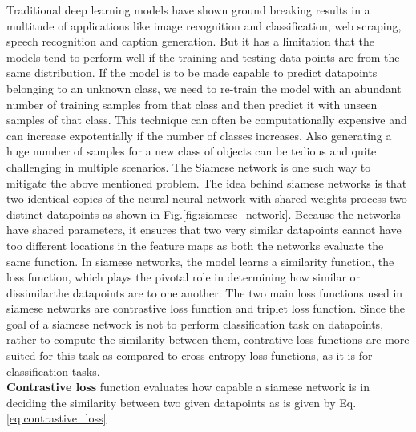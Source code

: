 Traditional deep learning models have shown ground breaking results in a multitude of applications like image recognition and classification, web scraping, speech recognition and caption generation. But it has a limitation that the models tend to perform well if the training and testing data points are from the same distribution. If the model is to be made capable to predict datapoints belonging to an unknown class, we need to re-train the model with an abundant number of training samples from that class and then predict it with unseen samples of that class. This technique can often be computationally expensive and can increase expotentially if the number of classes increases. Also generating a huge number of samples for a new class of objects can be tedious and quite challenging in multiple scenarios. The Siamese network\cite*{koch2015siamese,bromley1993signature} is one such way to mitigate the above mentioned problem. The idea behind siamese networks is that two identical copies of the neural neural network with shared weights process two distinct datapoints as shown in Fig.\ref*{fig:siamese_network}. Because the networks have shared parameters, it ensures that two very similar datapoints cannot have too different locations in the feature maps as both the networks evaluate the same function. In siamese networks, the model learns a similarity function, the loss function, which plays the pivotal role in determining how similar or dissimilarthe datapoints are to one another. The two main loss functions used in siamese networks are contrastive loss function\cite*{bromley1993signature} and triplet loss function\cite*{balntas2016learning}. Since the goal of a siamese network is not to perform classification task on datapoints, rather to compute the similarity between them, contrative loss functions are more suited for this task as compared to cross-entropy loss functions, as it is for classification tasks.\\
\textbf{Contrastive loss} function evaluates how capable a siamese network is in deciding the similarity between two given datapoints as is given by Eq.\ref*{eq:contrastive_loss}\cite*{siamese_network}

